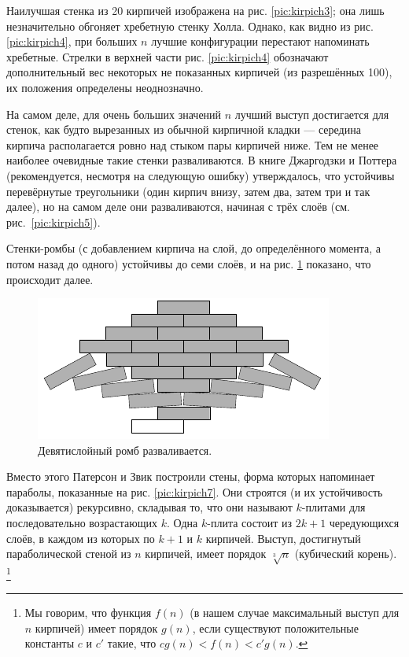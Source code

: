 Наилучшая стенка из 20 кирпичей изображена на рис. \ref{pic:kirpich3};
она лишь незначительно обгоняет хребетную стенку Холла.
Однако, как видно из рис. \ref{pic:kirpich4},  при больших $n$ лучшие конфигурации перестают напоминать хребетные.
Стрелки в верхней части рис. \ref{pic:kirpich4} обозначают дополнительный вес некоторых не показанных кирпичей (из разрешённых 100), их положения определены неоднозначно.

На самом деле, для очень больших значений $n$ лучший выступ достигается для стенок, как будто вырезанных из обычной кирпичной кладки --- середина кирпича располагается ровно над стыком пары кирпичей ниже.
Тем не менее наиболее очевидные такие стенки разваливаются.
В книге Джаргодзки и Поттера \cite{38} (рекомендуется, несмотря на следующую ошибку) утверждалось, что устойчивы перевёрнутые треугольники (один кирпич внизу, затем два, затем три и так далее), но на самом деле они разваливаются, начиная с трёх слоёв (см. рис.~\ref{pic:kirpich5}).  

Стенки-ромбы (с добавлением кирпича на слой, до определённого момента, а потом назад до одного) устойчивы до семи слоёв, и на рис. \ref{pic:kirpich6} показано, что происходит далее.

\begin{figure}[htb!]
\centering
\includegraphics[scale=1]{pics/kirpich6}
\caption{Девятислойный ромб разваливается.}
\label{pic:kirpich6}
\end{figure}

Вместо этого Патерсон и Звик построили стены, форма которых напоминает параболы, показанные на рис. \ref{pic:kirpich7}.
Они строятся (и их устойчивость доказывается) рекурсивно, складывая то, что они называют $k$-плитами для последовательно возрастающих $k$.
Одна $k$-плита состоит из $2k + 1$ чередующихся слоёв, в каждом из которых по $k + 1$ и $k$ кирпичей.
Выступ, достигнутый параболической стеной из $n$ кирпичей, имеет порядок $\sqrt[3]{n}$ (кубический корень).%
\footnote{Мы говорим, что функция $f (n)$ (в нашем случае максимальный выступ для $n$ кирпичей) имеет порядок $g(n)$, если существуют положительные константы $c$ и $c'$ такие, что $c g(n) < f (n) < c' g(n)$.}

